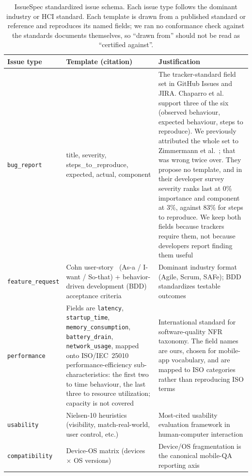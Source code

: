 \documentclass[preprint,12pt]{elsarticle}
\begin{document}
\begin{table}[!htbp]
  \centering
  \footnotesize
  \caption{IssueSpec standardized issue schema. Each issue type follows the dominant industry or
  HCI standard. Each template is drawn from a published standard or reference and reproduces its
  named fields; we ran no conformance check against the standards documents themselves, so
  ``drawn from'' should not be read as ``certified against''.}\label{tab:templates}
  \setlength{\tabcolsep}{4pt}\renewcommand{\arraystretch}{1.15}
  \begin{tabularx}{\textwidth}{@{}p{2.7cm}LL@{}}
  \toprule
  Issue type & Template (citation) & Justification \\
  \midrule
  \texttt{bug\_report} & title, severity, steps\_to\_reproduce, expected, actual, component &
  The tracker-standard field set in GitHub Issues and JIRA. Chaparro et
  al.~\cite{chaparro2017detecting} support three of the six (observed behaviour, expected
  behaviour, steps to reproduce). We previously attributed the whole set to
  Zimmermann et al.~\cite{zimmermann2010makes}; that was wrong twice over. They propose no
  template, and in their developer survey severity ranks last at 0\% importance and component at
  3\%, against 83\% for steps to reproduce. We keep both fields because trackers require them, not
  because developers report finding them useful \\
  \texttt{feature\_request} & Cohn user-story~\cite{cohn2004user} (As-a / I-want / So-that) +
  behavior-driven development (BDD) acceptance criteria~\cite{hellesoy2017cucumber} & Dominant
  industry format (Agile, Scrum, SAFe); BDD standardizes testable outcomes \\
  \texttt{performance} & Fields are \texttt{latency}, \texttt{startup\_time},
  \texttt{memory\_consumption}, \texttt{battery\_drain}, \texttt{network\_usage}, mapped onto
  ISO/IEC~25010~\cite{international2011systems} performance-efficiency sub-characteristics: the
  first two to time behaviour, the last three to resource utilization; capacity is not covered &
  International standard for software-quality NFR taxonomy. The field names are ours, chosen for
  mobile-app vocabulary, and are mapped to ISO categories rather than reproducing ISO terms \\
  \texttt{usability} & Nielsen-10 heuristics~\cite{nielsen1994usability} (visibility, match-real-world,
  user control, etc.) & Most-cited usability evaluation framework in human-computer interaction
  \\ 
  \texttt{compatibility} & Device-OS matrix (devices $\times$ OS
  versions)~\cite{joorabchi2013real} & Device/OS fragmentation is the canonical mobile-QA
  reporting axis \\   
  \bottomrule
  \end{tabularx}
  \end{table}
\end{document}
